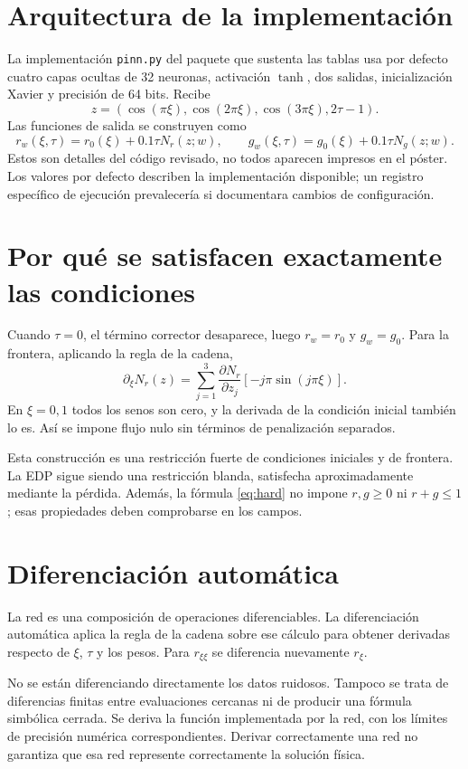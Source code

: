 \documentclass[11pt,a4paper]{report}
\begin{document}
\section{Arquitectura de la implementación}
La implementación \texttt{pinn.py} del paquete que sustenta las tablas usa por defecto cuatro capas ocultas de 32 neuronas, activación $\tanh$, dos salidas, inicialización Xavier y precisión de 64 bits. Recibe
\[
z=(\cos(\pi\xi),\cos(2\pi\xi),\cos(3\pi\xi),2\tau-1).
\]
Las funciones de salida se construyen como
\begin{equation}
r_w(\xi,\tau)=r_0(\xi)+0.1\tau N_r(z;w),\qquad
g_w(\xi,\tau)=g_0(\xi)+0.1\tau N_g(z;w).
\label{eq:hard}
\end{equation}
Estos son detalles del código revisado, no todos aparecen impresos en el póster. Los valores por defecto describen la implementación disponible; un registro específico de ejecución prevalecería si documentara cambios de configuración.

\section{Por qué se satisfacen exactamente las condiciones}
Cuando $\tau=0$, el término corrector desaparece, luego $r_w=r_0$ y $g_w=g_0$. Para la frontera, aplicando la regla de la cadena,
\[
\partial_\xi N_r(z)=\sum_{j=1}^{3}\frac{\partial N_r}{\partial z_j}
[-j\pi\sin(j\pi\xi)].
\]
En $\xi=0,1$ todos los senos son cero, y la derivada de la condición inicial también lo es. Así se impone flujo nulo sin términos de penalización separados.

Esta construcción es una restricción fuerte de condiciones iniciales y de frontera. La EDP sigue siendo una restricción blanda, satisfecha aproximadamente mediante la pérdida. Además, la fórmula \eqref{eq:hard} no impone $r,g\ge0$ ni $r+g\le1$; esas propiedades deben comprobarse en los campos.

\section{Diferenciación automática}
La red es una composición de operaciones diferenciables. La diferenciación automática aplica la regla de la cadena sobre ese cálculo para obtener derivadas respecto de $\xi$, $\tau$ y los pesos. Para $r_{\xi\xi}$ se diferencia nuevamente $r_\xi$.

No se están diferenciando directamente los datos ruidosos. Tampoco se trata de diferencias finitas entre evaluaciones cercanas ni de producir una fórmula simbólica cerrada. Se deriva la función implementada por la red, con los límites de precisión numérica correspondientes. Derivar correctamente una red no garantiza que esa red represente correctamente la solución física.
\end{document}
